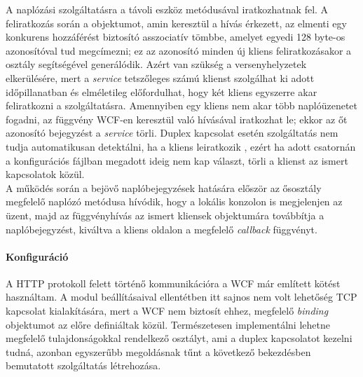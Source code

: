 A naplózási szolgáltatásra a távoli eszköz  metódusával iratkozhatnak fel. A feliratkozás során a  objektumot, amin keresztül a hívás érkezett, az  elmenti egy konkurens hozzáférést biztosító asszociatív tömbbe, amelyet egyedi 128 byte-os azonosítóval tud megcímezni; ez az azonosító minden új kliens feliratkozásakor a  osztály segítségével generálódik. Azért van szükség a versenyhelyzetek elkerülésére, mert a \emph{service} tetszőleges számú klienst szolgálhat ki adott időpillanatban és elméletileg előfordulhat, hogy két kliens egyszerre akar feliratkozni a szolgáltatásra. Amennyiben egy kliens nem akar több naplóüzenetet fogadni, az  függvény WCF-en keresztül való hívásával iratkozhat le; ekkor az őt azonosító bejegyzést a \emph{service} törli. Duplex kapcsolat esetén szolgáltatás nem tudja automatikusan detektálni, ha a kliens leiratkozik \cite{wcf-doc}, ezért ha adott csatornán a konfigurációs fájlban megadott ideig nem kap választ, törli a klienst az ismert kapcsolatok közül.\\
A működés során a bejövő naplóbejegyzések hatására először az ősosztály megfelelő naplózó metódusa hívódik, hogy a lokális konzolon is megjelenjen az üzent, majd az  függvényhívás az ismert kliensek  objektumára továbbítja a naplóbejegyzést, kiváltva a kliens oldalon a megfelelő \emph{callback} függvényt.

\paragraph{Konfiguráció} A HTTP protokoll felett történő kommunikációra a WCF már említett  kötést használtam. A  modul beállításaival ellentétben itt sajnos nem volt lehetőség TCP kapcsolat kialakítására, mert a WCF nem biztosít ehhez, megfelelő \emph{binding} objektumot az előre definiáltak közül. Természetesen implementálni lehetne megfelelő tulajdonságokkal rendelkező osztályt, ami a duplex kapcsolatot kezelni tudná, azonban egyszerűbb megoldásnak tűnt a következő bekezdésben bemutatott szolgáltatás létrehozása.

\subsection{}
